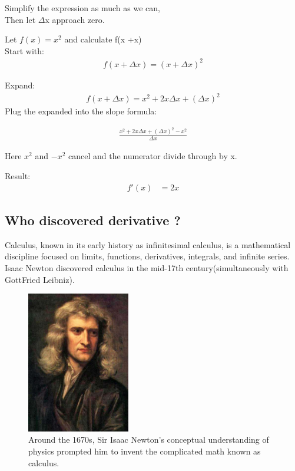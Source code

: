 \documentclass[aps,pra,notitlepage,amsmath,amssymb,letterpaper,12pt]{revtex4-1}
\newenvironment{problem}[2][Problem]{\begin{trivlist}
\item[\hskip \labelsep {\bfseries #1}\hskip \labelsep {\bfseries #2.}]}{\end{trivlist}}
\begin{document}
Simplify the expression as much as we can,\\
Then let $\Delta$x approach zero.\\
\begin{problem}{1}
Let $f(x) = x^2$ and calculate f(x +\Delta x)\\

Start with:\\
\begin{align}
f(x +\Delta x) = (x +\Delta x)^2
\end{align}

Expand:\\
\begin{align}
f(x +\Delta x) = x^2 + 2x\Delta x +(\Delta x)^2
\end{align}
Plug the expanded into the slope formula:

\begin{align}
\frac{x^2 + 2x\Delta x +(\Delta x)^2 - x^2}{\Delta x} 
\end{align}

Here $x^2$ and $-x^2$ cancel and the numerator divide through by \Delta x.

Result:
\begin{align}
f'(x) &= 2x
\end{align}

\subsection{Who discovered derivative ?} %

Calculus, known in its early history as infinitesimal calculus, is a mathematical discipline focused on limits, functions, derivatives, integrals, and infinite series. Isaac Newton discovered calculus in the mid-17th century(simultaneously with GottFried Leibniz).

\begin{figure}[h!] %
  \includegraphics[width=0.4\textwidth]
  {GodfreyKneller-IsaacNewton-1689.jpg}  %
  \caption{Around the 1670s, Sir Isaac Newton's conceptual understanding of physics prompted him to invent the complicated math known as calculus.}
  \label{fig:figlabel}
\end{figure}

\end{problem}
\end{document}
